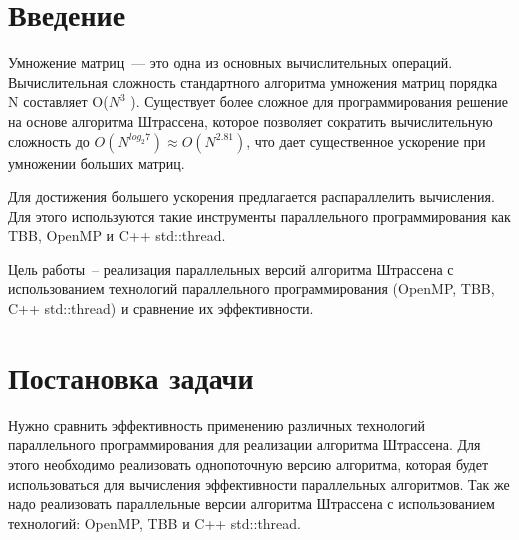 \documentclass{report}
\begin{document}
\tableofcontents
\newpage

\section{Введение}
\par Умножение матриц~--- это одна из основных вычислительных операций. Вычислительная сложность стандартного алгоритма умножения матриц порядка N составляет O($N^{3}$
). Существует более сложное для программирования решение на основе алгоритма Штрассена, которое позволяет сократить вычислительную сложность до $O(N^{log_{2}7}) \approx O(N^{2.81})$, что дает существенное ускорение при умножении больших матриц.
\par Для достижения большего ускорения предлагается распараллелить вычисления. Для этого используются такие инструменты параллельного программирования как TBB, OpenMP и C++ std::thread.
\par Цель работы~-- реализация параллельных версий алгоритма Штрассена с использованием технологий параллельного программирования (OpenMP, TBB, C++ std::thread) и сравнение их эффективности.

\newpage

\section{Постановка задачи}
\par Нужно сравнить эффективность применению различных технологий параллельного программирования для реализации алгоритма Штрассена. Для этого необходимо реализовать однопоточную версию алгоритма, которая будет использоваться для вычисления эффективности параллельных алгоритмов. Так же надо реализовать параллельные версии алгоритма Штрассена с использованием технологий: OpenMP, TBB и C++ std::thread.


\newpage
\end{document}
